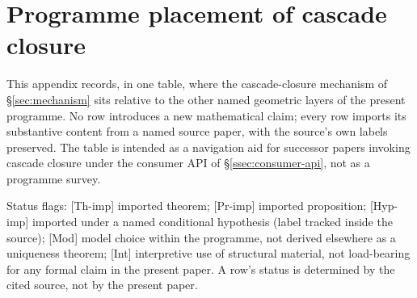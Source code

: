 \documentclass[11pt]{article}
\theoremstyle{definition}
\begin{document}
\section{Programme placement of cascade closure}\label{app:rung-placement}

This appendix records, in one table, where the cascade-closure
mechanism of \S\ref{sec:mechanism} sits relative to the other named
geometric layers of the present programme. No row introduces a new
mathematical claim; every row imports its substantive content from a
named source paper, with the source's own labels preserved. The table
is intended as a navigation aid for successor papers invoking
cascade closure under the consumer API of
\S\ref{ssec:consumer-api}, not as a programme survey.

Status flags: \textsf{[Th-imp]} imported theorem; \textsf{[Pr-imp]}
imported proposition; \textsf{[Hyp-imp]} imported under a named
conditional hypothesis (label tracked inside the source); \textsf{[Mod]}
model choice within the programme, not derived elsewhere as a
uniqueness theorem; \textsf{[Int]} interpretive use of structural
material, not load-bearing for any formal claim in the present
paper. A row's status is determined by the cited source, not by the
present paper.
\end{document}
